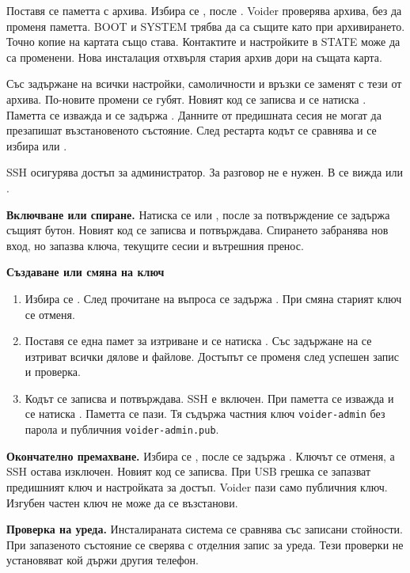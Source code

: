 Поставя се паметта с архива. Избира се  \arr {} \arr {} \arr {}, после . Voider проверява архива, без да променя паметта. BOOT и SYSTEM трябва да са същите като при архивирането. Точно копие на картата също става. Контактите и настройките в STATE може да са променени. Нова инсталация отхвърля стария архив дори на същата карта.

Със задържане на  всички настройки, самоличности и връзки се заменят с тези от архива. По-новите промени се губят. Новият код се записва и се натиска . Паметта се изважда и се задържа . Данните от предишната сесия не могат да презапишат възстановеното състояние. След рестарта кодът се сравнява и се избира  или .

SSH осигурява достъп за администратор. За разговор не е нужен. В  \arr {} \arr {} \arr {} се вижда  или .

\textbf{Включване или спиране.} Натиска се  или , после за потвърждение се задържа същият бутон. Новият код се записва и потвърждава. Спирането забранява нов вход, но запазва ключа, текущите сесии и вътрешния пренос.

\textbf{Създаване или смяна на ключ}
\begin{enumerate}
\item Избира се . След прочитане на въпроса се задържа . При смяна старият ключ се отменя.
\item Поставя се една памет за изтриване и се натиска . Със задържане на  се изтриват всички дялове и файлове. Достъпът се променя след успешен запис и проверка.
\item Кодът се записва и потвърждава. SSH е включен. При  паметта се изважда и се натиска . Паметта се пази. Тя съдържа частния ключ \texttt{voider-admin} без парола и публичния \texttt{voider-admin.pub}.
\end{enumerate}
\textbf{Окончателно премахване.} Избира се , после се задържа . Ключът се отменя, а SSH остава изключен. Новият код се записва. При USB грешка се запазват предишният ключ и настройката за достъп. Voider пази само публичния ключ. Изгубен частен ключ не може да се възстанови.

\textbf{Проверка на уреда.} Инсталираната система се сравнява със записани стойности. При  запазеното състояние се сверява с отделния запис за уреда. Тези проверки не установяват кой държи другия телефон.

